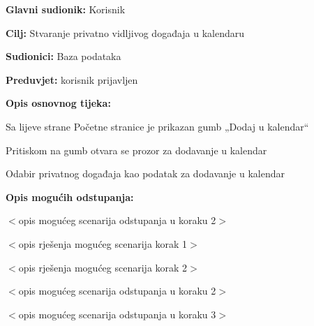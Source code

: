 			\noindent {}
		\begin{packed_item}
			
			\item \textbf{Glavni sudionik: }Korisnik
			\item  \textbf{Cilj:} Stvaranje privatno vidljivog događaja u kalendaru
			\item  \textbf{Sudionici:}
			Baza podataka
			\item  \textbf{Preduvjet:} korisnik prijavljen
			\item  \textbf{Opis osnovnog tijeka:}
			
			\item[] \begin{packed_enum}
				
				\item	Sa lijeve strane Početne stranice je prikazan gumb „Dodaj u kalendar“
				\item 	Pritiskom na gumb otvara  se prozor za dodavanje u kalendar
				\item	Odabir privatnog događaja kao podatak za dodavanje u kalendar
				
			\end{packed_enum}
			
			\item  \textbf{Opis mogućih odstupanja:}
			
			\item[] \begin{packed_item}
				
				\item[2.a] $<$opis mogućeg scenarija odstupanja u koraku 2$>$
				\item[] \begin{packed_enum}
					
					\item $<$opis rješenja mogućeg scenarija korak 1$>$
					\item $<$opis rješenja mogućeg scenarija korak 2$>$
					
				\end{packed_enum}
				\item[2.b] $<$opis mogućeg scenarija odstupanja u koraku 2$>$
				\item[3.a] $<$opis mogućeg scenarija odstupanja  u koraku 3$>$
				
			\end{packed_item}
		\end{packed_item}
	
